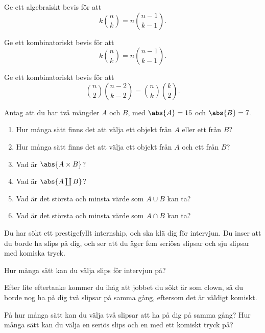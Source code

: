 \documentclass{tufte-handout}
\begin{document}
\begin{xca}
	Ge ett algebraiskt bevis för att
	$$k\binom{n}{k} = n \binom{n-1}{k-1}.$$
\end{xca}

\begin{xca}
	Ge ett kombinatoriskt bevis för att
	$$k\binom{n}{k} = n \binom{n-1}{k-1}.$$
\end{xca}

\begin{xca}
	Ge ett kombinatoriskt bevis för att
	$$\binom{n}{2}\binom{n-2}{k-2} = \binom{n}{k}\binom{k}{2}.$$
\end{xca}

\begin{xca}
	Antag att du har två mängder $A$ och $B$, med $\abs{A} = 15$ och $\abs{B} = 7$.
	\begin{enumerate}
		\item Hur många sätt finns det att välja ett objekt från $A$ eller ett från $B$?
		\item Hur många sätt finns det att välja ett objekt från $A$ och ett från $B$?
		\item Vad är $\abs{A\times B}$?
		\item Vad är $\abs{A \coprod B}$?
		\item Vad är det största och minsta värde som $A \cup B$ kan ta?
		\item Vad är det största och minsta värde som $A \cap B$ kan ta?
	\end{enumerate}
\end{xca}

\begin{xca}
	Du har sökt ett prestigefyllt internship, och ska klä dig för intervjun. Du inser att du borde ha slips på dig, och ser att du äger fem seriösa slipsar och sju slipsar med komiska tryck.
  
	Hur många sätt kan du välja slips för intervjun på?
  
	Efter lite eftertanke kommer du ihåg att jobbet du sökt är som clown, så du borde nog ha på dig två slipsar på samma gång, eftersom det är väldigt komiskt.

	På hur många sätt kan du välja två slipsar att ha på dig på samma gång? Hur många sätt kan du välja en seriös slips och en med ett komiskt tryck på?
  \end{xca}



\end{document}
